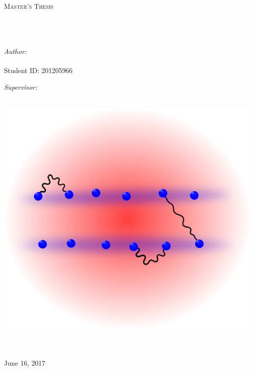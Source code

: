\documentclass[11pt, twoside]{Thesis}
\begin{document}
\begin{titlepage}
\begin{center}

\textsc{\LARGE \univname}\\[1.5cm] %
\textsc{\Large Master's Thesis}\\[0.5cm] %

\HRule \\[0.4cm] %
{\huge \bfseries \ttitle}\\[0.4cm] %
\HRule \\[1.5cm] %
 
\begin{minipage}[t]{0.4\textwidth}
\begin{flushleft} \large
\emph{Author:}\\
{\authornames}\\ 
{Student ID: 201205966} %
\end{flushleft}
\end{minipage}%
\begin{minipage}[t]{0.4\textwidth}
\begin{flushright} \large
\emph{Supervisor:} \\
{\supname} %
\end{flushright}
\end{minipage}\\[0cm]
\vspace{2.5cm}
\includegraphics[width=0.6\columnwidth]{1D3Dsketchfrontpage.eps} 
 
\large 
\deptname \\ \facname \\[1cm] %


 
{\large June 16, 2017} %

 
\vfill
\end{center}

\end{titlepage}
\end{document}
